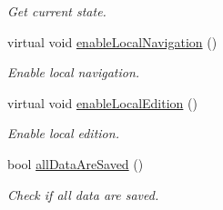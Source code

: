 \begin{DoxyCompactItemize}
\begin{DoxyCompactList}\small\item\em Get current state. \end{DoxyCompactList}\item 
virtual void \hyperlink{classmdt_abstract_sql_widget_a586e89097e9b4c27888695796ce945a0}{enableLocalNavigation} ()
\begin{DoxyCompactList}\small\item\em Enable local navigation. \end{DoxyCompactList}\item 
virtual void \hyperlink{classmdt_abstract_sql_widget_a4ad94a530c77292d122d38eb041da6e9}{enableLocalEdition} ()
\begin{DoxyCompactList}\small\item\em Enable local edition. \end{DoxyCompactList}\item 
bool \hyperlink{classmdt_abstract_sql_widget_aa5824c5fc3b0a7e118dd9ebb19084d2c}{allDataAreSaved} ()
\begin{DoxyCompactList}\small\item\em Check if all data are saved. \end{DoxyCompactList}\end{DoxyCompactItemize}
